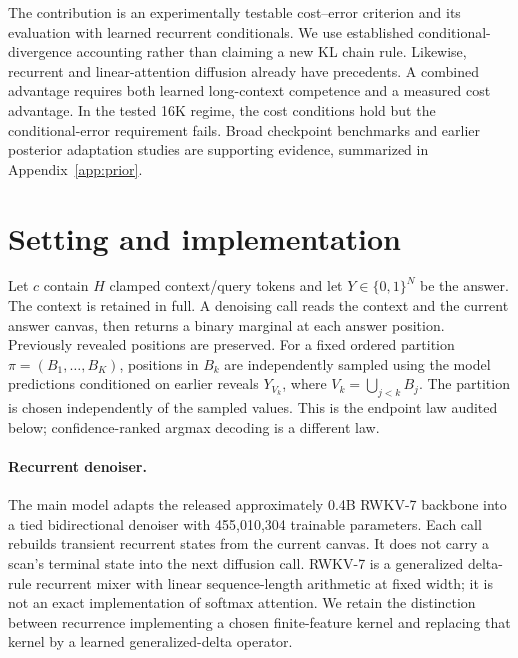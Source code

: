 \documentclass{article}
\begin{document}
The contribution is an experimentally testable cost--error criterion
and its evaluation with learned recurrent conditionals. We use established
conditional-divergence accounting rather than claiming a new KL chain rule.
Likewise, recurrent and linear-attention diffusion already have precedents.
A combined advantage requires both learned long-context competence and a
measured cost advantage. In the tested 16K regime, the cost conditions hold
but the conditional-error requirement fails. Broad checkpoint benchmarks and earlier posterior adaptation
studies are supporting evidence, summarized in Appendix~\ref{app:prior}.

\section{Setting and implementation}
Let $c$ contain $H$ clamped context/query tokens and let $Y\in\{0,1\}^N$ be the
answer. The context is retained in full. A denoising call reads the context and
the current answer canvas, then returns a binary marginal at each answer
position. Previously revealed positions are preserved. For a fixed ordered
partition $\pi=(B_1,\ldots,B_K)$, positions in $B_k$ are independently sampled
using the model predictions conditioned on earlier reveals
$Y_{V_k}$, where $V_k=\bigcup_{j<k}B_j$. The partition is chosen independently
of the sampled values. This is the endpoint law audited below; confidence-ranked
argmax decoding is a different law.

\paragraph{Recurrent denoiser.}
The main model adapts the released approximately 0.4B RWKV-7 backbone
\citep{rwkv7} into a tied bidirectional denoiser with 455,010,304 trainable
parameters. Each call rebuilds transient recurrent states from the current
canvas. It does not carry a scan's terminal state into the next diffusion call.
RWKV-7 is a generalized delta-rule recurrent mixer with linear sequence-length
arithmetic at fixed width; it is not an exact implementation of softmax
attention. We retain the distinction between recurrence implementing a chosen
finite-feature kernel \citep{lineartransformer} and replacing that kernel by a
learned generalized-delta operator.
\end{document}

